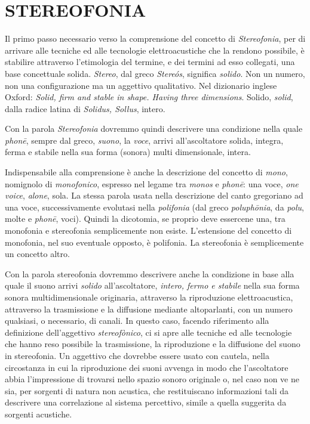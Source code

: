 
\chapter{STEREOFONIA}
\startcontents[chapters]

\vfill\null

Il primo passo necessario verso la comprensione del concetto di \emph{Stereofonia},
per di arrivare alle tecniche ed alle tecnologie elettroacustiche che la
rendono possibile, è stabilire attraverso l'etimologia del termine, e dei
termini ad esso collegati, una base concettuale solida. \emph{Stereo}, dal greco
\emph{Stere\'os}, significa \emph{solido}. Non un numero, non una configurazione
ma un aggettivo qualitativo. Nel dizionario inglese Oxford: \emph{Solid, firm
and stable in shape. Having three dimensions}. Solido, \emph{solid}, dalla radice
latina di \emph{Solidus, Sollus}, intero.

Con la parola \emph{Stereofonia} dovremmo quindi descrivere una condizione
nella quale \emph{phon\={e}}, sempre dal greco, \emph{suono}, la \emph{voce},
arrivi all'ascoltatore solida, integra, ferma e stabile nella sua forma (sonora)
multi dimensionale, intera.


Indispensabile alla comprensione è anche la descrizione del concetto di \emph{mono}, nomignolo di
\emph{monofonico}, espresso nel legame tra \emph{monos} e \emph{phon\={e}}: una voce,
\emph{one voice}, \emph{alone}, sola. La stessa parola usata nella descrizione
del canto gregoriano ad una voce, successivamente evolutasi nella \emph{polifonia}
(dal greco \emph{poluph\={o}nia}, da \emph{polu}, molte e \emph{phon\={e}},
voci). Quindi la dicotomia, se proprio deve essercene una, tra monofonia e
stereofonia semplicemente non esiste. L'estensione del concetto di monofonia,
nel suo eventuale opposto, è polifonia. La stereofonia è semplicemente un
concetto altro.

Con la parola stereofonia dovremmo descrivere anche la condizione in base alla
quale il suono arrivi \emph{solido} all'ascoltatore, \emph{intero, fermo e
stabile} nella sua forma sonora multidimensionale originaria, attraverso
la riproduzione elettroacustica, attraverso la trasmissione e la diffusione mediante
altoparlanti, con un numero qualsiasi, o necessario, di canali. In questo caso,
facendo riferimento alla definizione dell'aggettivo \emph{stereofònico}, ci
si apre alle tecniche ed alle tecnologie che hanno reso possibile la
trasmissione, la riproduzione e la diffusione del suono in stereofonia.
Un aggettivo che dovrebbe essere usato con cautela, nella circostanza in cui la
riproduzione dei suoni avvenga in modo
che l’ascoltatore abbia l’impressione di trovarsi nello spazio sonoro originale o,
nel caso non ve ne sia, per sorgenti di natura non acustica, che restituiscano
informazioni tali da descrivere una correlazione al sistema percettivo, simile a
quella suggerita da sorgenti acustiche.

